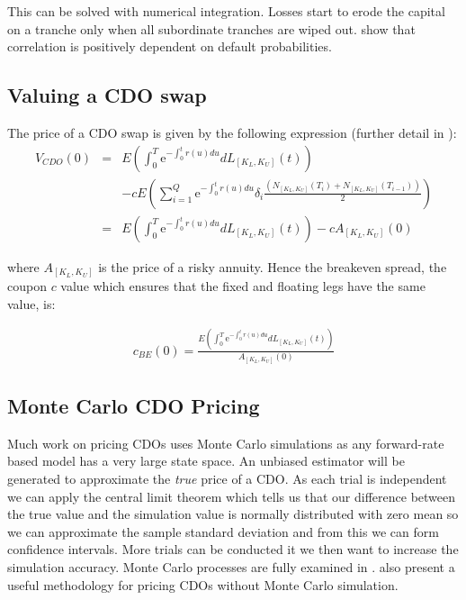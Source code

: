 This can be solved with numerical integration.  Losses start to erode the capital on a tranche only when all subordinate tranches are wiped out. \cite{HPW2005} show that correlation is positively dependent on default probabilities.




\subsection{Valuing a CDO swap}

The price of a CDO swap is given by the following expression (further detail in \cite{Eli2006}):
\begin{eqnarray}
 V_{CDO}(0) & =  & E\left(\int^{T}_{0} \mathrm{e}^{- \int^t_0 r(u) du } dL_{[K_L,K_U]} (t) \right) \nonumber\\ 
& & - c E\left(\sum^{Q}_{i = 1} \mathrm{e}^{- \int^t_0 r(u) du } \delta_i \frac{(N_{[K_L,K_U]}(T_i) + N_{[K_L,K_U]}(T_{i-1}))}{2}  \right) \nonumber\\  
 & = & E\left(\int^{T}_{0} \mathrm{e}^{- \int^t_0 r(u) du } dL_{[K_L,K_U]} (t) \right) - c A_{[K_L,K_U]}(0)
\end{eqnarray}

where $A_{[K_L,K_U]}$ is the price of a risky annuity. Hence the breakeven spread, the coupon $c$ value which
ensures that the fixed and floating legs have the same value, is:

\begin{align}\label{credSpread}
 c_{BE}(0) = \frac{E\left(\int^{T}_{0} \mathrm{e}^{- \int^t_0 r(u) du } dL_{[K_L,K_U]} (t) \right) }{ A_{[K_L,K_U]}(0)}
\end{align}




\subsection{Monte Carlo CDO Pricing}

Much work on pricing CDOs uses Monte Carlo simulations as any forward-rate based model has a very large state space.  An unbiased estimator will be generated to approximate the {\em true} price of a CDO.  As each trial is independent we can apply the central limit theorem which tells us that our difference between the true value and the simulation value is normally distributed with zero mean so we can approximate the sample standard deviation and from this we can form confidence intervals. More trials can be conducted it we then want to increase the simulation accuracy.  Monte Carlo processes are fully examined in \cite{Sch2003}.
\cite{hw2004} also present a useful methodology for pricing CDOs without Monte Carlo simulation.

